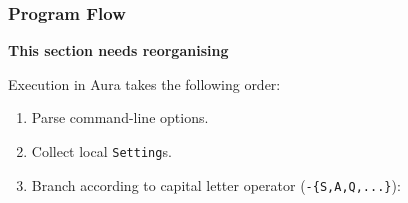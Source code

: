 \documentclass{article}
\begin{document}
\subsubsection{Program Flow}\label{program-flow}

\textbf{This section needs reorganising}

Execution in Aura takes the following order:

\begin{enumerate}
\def\labelenumi{\arabic{enumi}.}
\itemsep1pt\parskip0pt
\item
  Parse command-line options.
\item
  Collect local \texttt{Setting}s.
\item
  Branch according to capital letter operator (\texttt{-\{S,A,Q,...\}}):
\end{enumerate}
\end{document}
